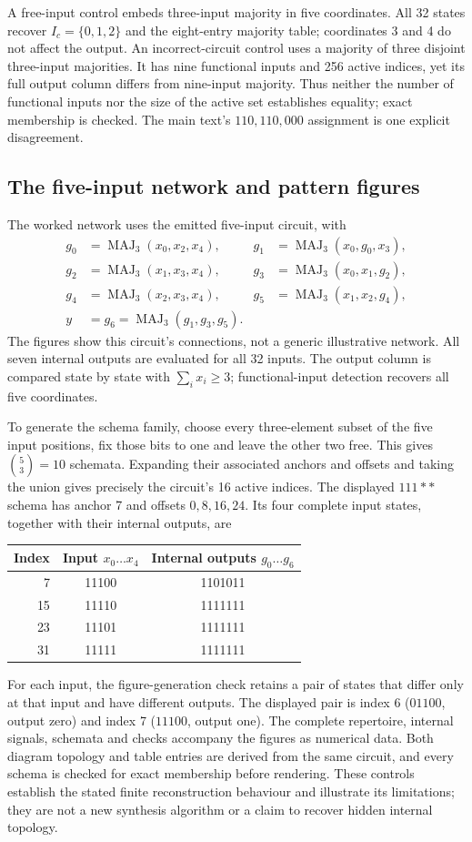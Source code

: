 \documentclass[11pt,a4paper]{article}
\newcommand{\Maj}{\operatorname{MAJ}_3}
\begin{document}
A free-input control embeds three-input majority in five coordinates. All
32 states recover $I_c=\{0,1,2\}$ and the eight-entry majority table;
coordinates 3 and 4 do not affect the output. An incorrect-circuit control
uses a majority of three disjoint three-input majorities. It has nine
functional inputs and 256 active indices, yet its full output column differs
from nine-input majority. Thus neither the number of functional inputs nor
the size of the active set establishes equality; exact membership is checked.
The main text's $110,110,000$ assignment is one explicit disagreement.

\subsection{The five-input network and pattern figures}
The worked network uses the emitted five-input circuit, with
\begin{align*}
g_0&=\Maj(x_0,x_2,x_4),&g_1&=\Maj(x_0,g_0,x_3),\\
g_2&=\Maj(x_1,x_3,x_4),&g_3&=\Maj(x_0,x_1,g_2),\\
g_4&=\Maj(x_2,x_3,x_4),&g_5&=\Maj(x_1,x_2,g_4),\\
y&=g_6=\Maj(g_1,g_3,g_5).
\end{align*}
The figures show this circuit's connections, not a generic illustrative
network. All seven internal outputs are evaluated for all 32 inputs.
The output column is compared state by state with $\sum_i x_i\ge3$;
functional-input detection recovers all five coordinates.

To generate the schema family, choose every three-element subset of the
five input positions, fix those bits to one and leave the other two free.
This gives $\binom53=10$ schemata. Expanding their associated anchors and
offsets and taking the union gives precisely the circuit's 16 active indices.
The displayed $111**$ schema has anchor 7 and offsets $0,8,16,24$.
Its four complete input states, together with their internal outputs, are
\begin{center}
\begin{tabular}{rcc}\toprule
Index & Input $x_0\ldots x_4$ & Internal outputs $g_0\ldots g_6$\\\midrule
7 & 11100 & 1101011\\
15 & 11110 & 1111111\\
23 & 11101 & 1111111\\
31 & 11111 & 1111111\\\bottomrule
\end{tabular}
\end{center}
For each input, the figure-generation check retains a pair of states
that differ only at that input and have different outputs. The displayed
pair is index 6 ($01100$, output zero) and index 7 ($11100$, output one).
The complete repertoire, internal signals, schemata and checks accompany
the figures as numerical data. Both diagram topology and table entries
are derived from the same circuit, and every schema is checked for exact
membership before rendering.
These controls establish the stated finite reconstruction behaviour and
illustrate its limitations; they are not a new synthesis algorithm or a
claim to recover hidden internal topology.
\end{document}
